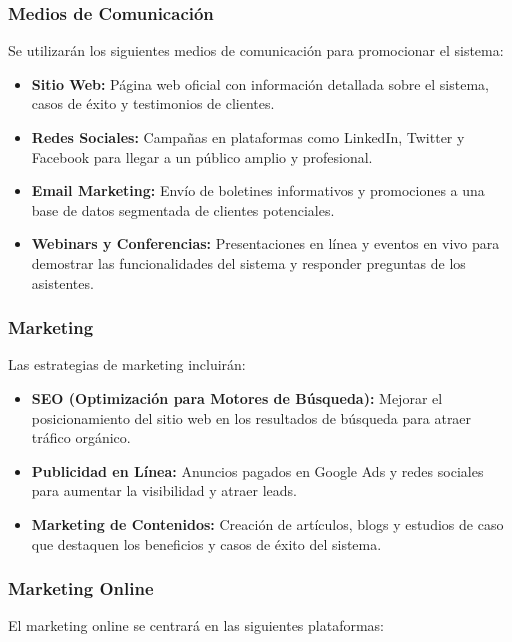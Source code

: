 \documentclass[a4paper,12pt]{article}
\begin{document}
\subsubsection{Medios de Comunicación}
Se utilizarán los siguientes medios de comunicación para promocionar el sistema:

\begin{itemize}
    \item \textbf{Sitio Web:} Página web oficial con información detallada sobre el sistema, casos de éxito y testimonios de clientes.
    \item \textbf{Redes Sociales:} Campañas en plataformas como LinkedIn, Twitter y Facebook para llegar a un público amplio y profesional.
    \item \textbf{Email Marketing:} Envío de boletines informativos y promociones a una base de datos segmentada de clientes potenciales.
    \item \textbf{Webinars y Conferencias:} Presentaciones en línea y eventos en vivo para demostrar las funcionalidades del sistema y responder preguntas de los asistentes.
\end{itemize}

\subsubsection{Marketing}
Las estrategias de marketing incluirán:

\begin{itemize}
    \item \textbf{SEO (Optimización para Motores de Búsqueda):} Mejorar el posicionamiento del sitio web en los resultados de búsqueda para atraer tráfico orgánico.
    \item \textbf{Publicidad en Línea:} Anuncios pagados en Google Ads y redes sociales para aumentar la visibilidad y atraer leads.
    \item \textbf{Marketing de Contenidos:} Creación de artículos, blogs y estudios de caso que destaquen los beneficios y casos de éxito del sistema.
\end{itemize}

\subsubsection{Marketing Online}
El marketing online se centrará en las siguientes plataformas:
\end{document}
